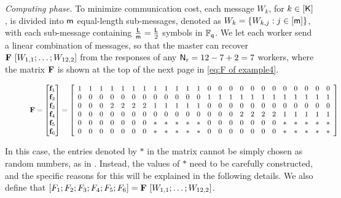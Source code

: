 \documentclass[conference,letterpaper]{IEEEtran}
\begin{document}
\begin{example}
{\it Computing phase.}
To minimize communication cost, each message $W_k$, for $k \in [{\sf K}]$, is divided into ${\sf m}$ equal-length sub-messages, denoted as $W_k = \{W_{k,j} : j \in [{\sf m}]\}$, with each sub-message containing $\frac{{\sf L}}{{\sf m}} = \frac{{\sf L}}{2}$ symbols in $\mathbb{F}_{{\sf q}}$. We let each worker send a linear combination of messages, so that the master can recover ${\bf F} \ [W_{1,1}; \ldots; W_{12,2}]$ from the responses of any ${\sf N}_{\rm r} = 12 - 7 + 2 = 7$ workers, where the matrix ${\bf F}$ is shown at the top of the next page in \eqref{eq:F of example4}.
\begin{figure}
\begin{equation}
 {\bf F} = \begin{bmatrix}  
 {{\bf f}}_1 \\
 {{\bf f}}_2 \\
 {{\bf f}}_3 \\
 {{\bf f}}_4\\
 {{\bf f}}_5 \\
 {{\bf f}}_6
 \end{bmatrix}
 =
 \left[
\begin{array}{cccccccccccccccccccccccc}
  1 & 1    &   1 &1 & 1  &     1 &1 & 1 &  1 & 1    &   1 &1 &   0 & 0  &0 &   0 & 0  &0 &   0 & 0  &0 &   0 & 0  &0     \\
   0 & 0  &0 &   0 & 0  &0 &   0 & 0  &0 &   0 & 0  &0  &  1 & 1    &   1 &1 & 1  &     1 &1 & 1 &  1 & 1    &   1 &1 \\
  0 & 0  &0  &  2 & 2 & 2  &2  &  1 &1 & 1  &1&1 &   0 & 0  &0  &   0 & 0  &0&   0 & 0  &0&   0 & 0  &0\\
  0 & 0  &0&   0 & 0  &0&   0 & 0  &0&   0 & 0  &0 & 0 & 0  &0  &  2 & 2 & 2  &2  &  1 &1 & 1  &1&1 \\
  0  & 0   &   0&0& 0   & 0  &0 &  * &* & *  &  * &*  &  0  & 0   &   0&0& 0   & 0  &0 &  * &* & *  &  * &* \\
   0  & 0   &   0&0& 0   & 0  &0 &  * &* & *  &  * &*  &  0  & 0   &   0&0& 0   & 0  &0 &  * &* & *  &  * &* \\
\end{array} 
\right]
 \label{eq:F of example4}
\end{equation}
\end{figure}

In this case, the entries denoted by $*$ in the matrix cannot be simply chosen as random numbers, as in \cite{wan2022secure}. Instead, the values of $*$ need to be carefully constructed, and the specific reasons for this will be explained in the following details.
 We also define that $[F_1;F_2;F_3;F_4;F_5;F_6]=  {\bf F} \  [W_{1,1};\ldots;W_{12,2}] $.


\end{example}
\end{document}
